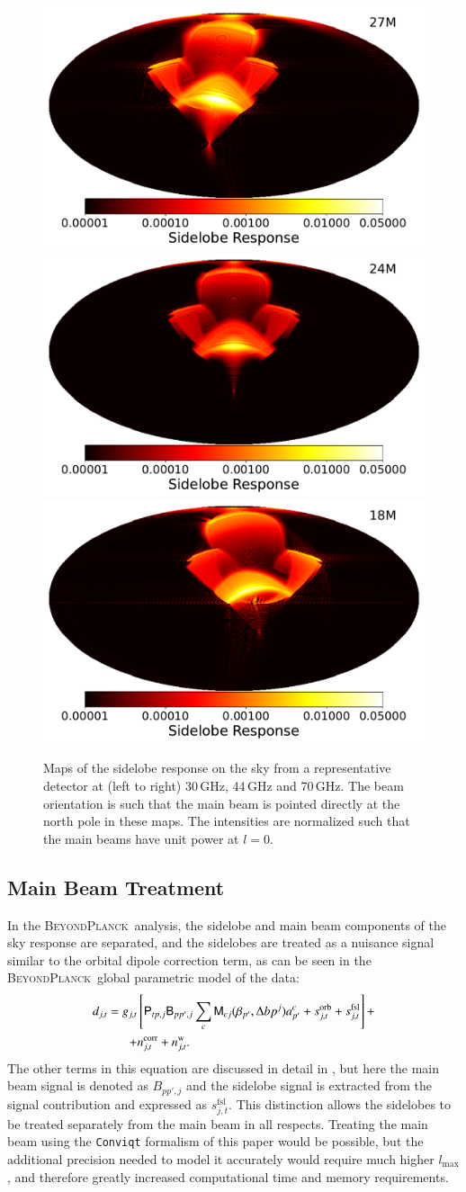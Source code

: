 \documentclass[twocolumn]{aa}
\newcommand{\B}[0]{\tens{B}}
\newcommand{\M}[0]{\tens{M}}
\renewcommand{\P}[0]{\tens{P}}
\newcommand{\BP}{\textsc{BeyondPlanck}}
\begin{document}
\begin{figure}[t]
  \center
  \includegraphics[width=0.33\linewidth]{scripts/sl_27_M.pdf}
  \includegraphics[width=0.33\linewidth]{scripts/sl_24_M.pdf}
  \includegraphics[width=0.33\linewidth]{scripts/sl_18_M.pdf}\\
  \caption{Maps of the sidelobe response on the sky from a representative detector at (left to right) 30\,GHz, 44\,GHz and 70\,GHz. The beam orientation is such that the main beam is pointed directly at the north pole in these maps. The intensities are normalized such that the main beams have unit power at $l=0$.
  }\label{fig:slresponse}
\end{figure}

\subsection{Main Beam Treatment}

In the \BP\ analysis, the sidelobe and main beam components of the sky response are separated, and the sidelobes are treated as a nuisance signal similar to the orbital dipole correction term, as can be seen in the \BP\ global parametric model of the data:
\begin{equation}
\begin{split}
d_{j,t} = g_{j,t}&\left[\P_{tp,j}\B_{pp',j}\sum_{c}
\M_{cj}(\beta_{p'}, \Delta bp^{j})a^c_{p'}  + s^{\mathrm{orb}}_{j,t}  
+ s^{\mathrm{fsl}}_{j,t}\right] + \\
+ &n^{\mathrm{corr}}_{j,t} + n^{\mathrm{w}}_{j,t}.
\end{split}
\label{eq:datamodel}
\end{equation}
The other terms in this equation are discussed in detail in \cite{BP01}, but here the main beam signal is denoted as $B_{pp',j}$ and the sidelobe signal is extracted from the signal contribution and expressed as $s^{\mathrm{fsl}}_{j,t}$. This distinction allows the sidelobes to be treated separately from the main beam in all respects. Treating the main beam using the \texttt{Conviqt} formalism of this paper would be possible, but the additional precision needed to model it accurately would require much higher $l_\mathrm{max}$, and therefore greatly increased computational time and memory requirements. 
\end{document}
